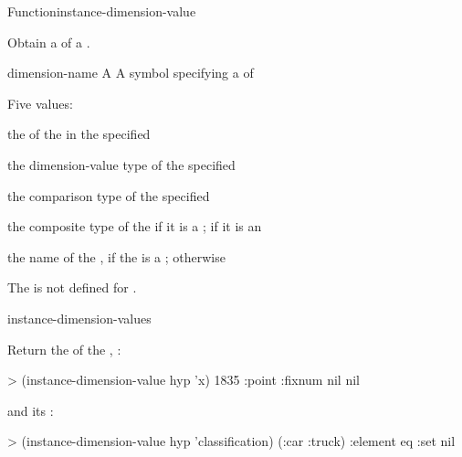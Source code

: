 \documentclass[10pt,twoside,english,pdftex]{article}
\begin{document}
\begin{functiondoc}{Function}{instance-dimension-value}%
  {
    \mbox{\returns{} }}
%
%

\fnsyntax

\fnpurpose Obtain a  of a .

\fnpackage {}

\fnmodule {}

\fnargs
\begin{args}{dimension-name}
 A 
 A symbol specifying a  of
\end{args}

\fnreturns Five values: 
\begin{tightitemize}
\item the  of the  in the specified
\item the dimension-value type of the specified 
\item the comparison type of the specified 
\item the composite type of the  if it is a
  ; \nil{} if it is an
\item the name of the , if the 
   is a ;
  \nil{} otherwise
\end{tightitemize}

\fnerrors The   is not defined for
. 

\begin{alsos}{instance-dimension-values}
\end{alsos}

\fnexamples
%
Return the   of the ,
:
%
\W\supp
\begin{example}
> (instance-dimension-value hyp 'x)
1835
:point
:fixnum
nil
nil
\end{example}
%
and its  :
%
\W\supp\notpretop
\begin{example}
> (instance-dimension-value hyp 'classification)
(:car :truck)
:element
eq
:set
nil
\end{example}


\end{functiondoc}
\end{document}
